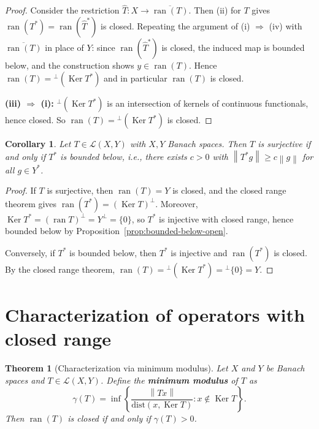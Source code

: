 \documentclass[a4paper,12pt]{book}
\DeclareMathOperator{\Ker}{Ker}
\DeclareMathOperator{\ran}{ran}
\newcommand{\norm}[1]{\left\| #1 \right\|}
\theoremstyle{definition}
\theoremstyle{plain}
\newtheorem{theorem}[definition]{Theorem}
\newtheorem{corollary}[definition]{Corollary}
\theoremstyle{remark}
\begin{document}
\begin{proof}
Consider the restriction $\hat{T} \colon X \to \overline{\ran(T)}$. Then (ii) for
$T$ gives $\ran(T^*) = \ran(\hat{T}^*)$ is closed. Repeating the argument of
(i) $\Rightarrow$ (iv) with $\overline{\ran(T)}$ in place of $Y$: since
$\ran(\hat{T}^*)$ is closed, the induced map is bounded below, and the construction
shows $y \in \ran(T)$. Hence $\ran(T) = {}^\perp(\Ker T^*)$ and in particular
$\ran(T)$ is closed.

\textbf{(iii) $\Rightarrow$ (i):} ${}^\perp(\Ker T^*)$ is an intersection of
kernels of continuous functionals, hence closed. So $\ran(T) = {}^\perp(\Ker T^*)$
is closed.
\end{proof}

\begin{corollary}\label{cor:surjective-iff-bounded-below}
Let $T \in \mathcal{L}(X,Y)$ with $X, Y$ Banach spaces. Then $T$ is surjective
if and only if $T^*$ is bounded below, i.e., there exists $c > 0$ with
$\norm{T^* g} \geq c \norm{g}$ for all $g \in Y^*$.
\end{corollary}

\begin{proof}
If $T$ is surjective, then $\ran(T) = Y$ is closed, and the closed range theorem
gives $\ran(T^*) = (\Ker T)^\perp$. Moreover, $\Ker T^* = (\ran T)^\perp
= Y^\perp = \{0\}$, so $T^*$ is injective with closed range, hence bounded below
by Proposition~\ref{prop:bounded-below-open}.

Conversely, if $T^*$ is bounded below, then $T^*$ is injective and $\ran(T^*)$
is closed. By the closed range theorem, $\ran(T) = {}^\perp(\Ker T^*)
= {}^\perp \{0\} = Y$.
\end{proof}

\section{Characterization of operators with closed range}%
\label{sec:closed-range-char}

\begin{theorem}[Characterization via minimum modulus]\label{thm:closed-range-modulus}
Let $X$ and $Y$ be Banach spaces and $T \in \mathcal{L}(X,Y)$. Define the
\textbf{minimum modulus} of $T$ as
\[
  \gamma(T) = \inf\!\left\{ \frac{\norm{Tx}}{\mathrm{dist}(x, \Ker T)} :
  x \notin \Ker T \right\}.
\]
Then $\ran(T)$ is closed if and only if $\gamma(T) > 0$.
\end{theorem}
\end{document}
